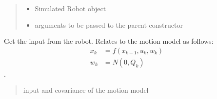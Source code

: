 \documentclass[letterpaper,10pt,english]{sphinxmanual}
\begin{document}
\begin{fulllineitems}
\begin{fulllineitems}
\begin{quote}
\begin{description}
\begin{itemize}
\item {} 
\sphinxAtStartPar
{} \textendash{} Simulated Robot object

\item {} 
\sphinxAtStartPar
{} \textendash{} arguments to be passed to the parent constructor

\end{itemize}

\end{description}\end{quote}

\end{fulllineitems}


\begin{fulllineitems}
\label{\detokenize{GFLocalization:GFLocalization.GFLocalization.GetInput}}
\pysigstartsignatures
{}
\pysigstopsignatures
\sphinxAtStartPar
Get the input from the robot. Relates to the motion model as follows:
\begin{equation}\label{equation:GFLocalization:eq-f-GFLocalization}
\begin{split}x_k &= f(x_{k-1},u_k,w_k) \\
w_k &= N(0,Q_k)\end{split}
\end{equation}
\sphinxAtStartPar
{} .
\begin{quote}\begin{description}
\sphinxAtStartPar
input and covariance of the motion model

\end{description}\end{quote}

\end{fulllineitems}



\end{fulllineitems}
\end{document}
